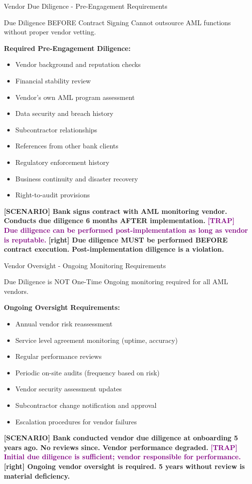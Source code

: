 \documentclass[11pt,a4paper]{beamer}
\newcommand{\trap}[1]{\textcolor{purple}{\textbf{[TRAP] #1}}}
\newcommand{\correct}[1]{\textcolor{green!50!black}{\textbf{[right] #1}}}
\newcommand{\scenario}[1]{\textcolor{blue!70!black}{\textbf{[SCENARIO] #1}}}
\begin{document}

\begin{frame}{Vendor Due Diligence - Pre-Engagement Requirements}
\begin{block}{Due Diligence BEFORE Contract Signing}
Cannot outsource AML functions without proper vendor vetting.
\end{block}
\textbf{Required Pre-Engagement Diligence:}
\begin{itemize}
\item Vendor background and reputation checks
\item Financial stability review
\item Vendor's own AML program assessment
\item Data security and breach history
\item Subcontractor relationships
\item References from other bank clients
\item Regulatory enforcement history
\item Business continuity and disaster recovery
\item Right-to-audit provisions
\end{itemize}
\scenario{Bank signs contract with AML monitoring vendor. Conducts due diligence 6 months AFTER implementation.}
\trap{Due diligence can be performed post-implementation as long as vendor is reputable.}
\correct{Due diligence MUST be performed BEFORE contract execution. Post-implementation diligence is a violation.}
\end{frame}

\begin{frame}{Vendor Oversight - Ongoing Monitoring Requirements}
\begin{block}{Due Diligence is NOT One-Time}
Ongoing monitoring required for all AML vendors.
\end{block}
\textbf{Ongoing Oversight Requirements:}
\begin{itemize}
\item Annual vendor risk reassessment
\item Service level agreement monitoring (uptime, accuracy)
\item Regular performance reviews
\item Periodic on-site audits (frequency based on risk)
\item Vendor security assessment updates
\item Subcontractor change notification and approval
\item Escalation procedures for vendor failures
\end{itemize}
\scenario{Bank conducted vendor due diligence at onboarding 5 years ago. No reviews since. Vendor performance degraded.}
\trap{Initial due diligence is sufficient; vendor responsible for performance.}
\correct{Ongoing vendor oversight is required. 5 years without review is material deficiency.}
\end{frame}
\end{document}
